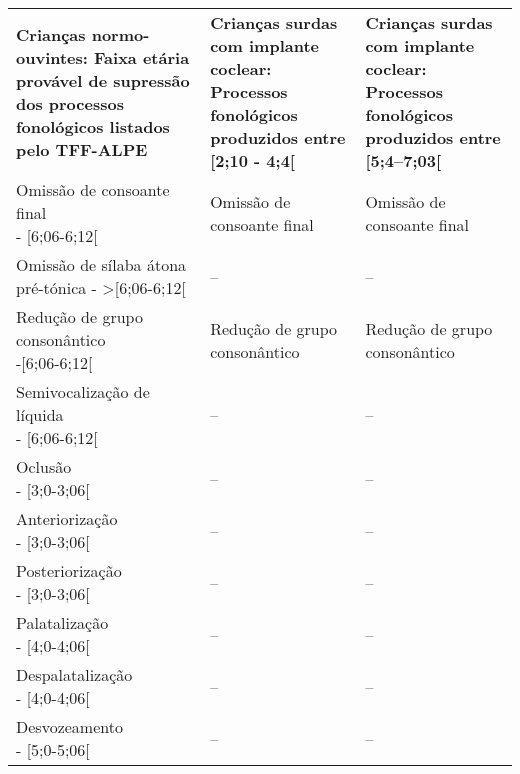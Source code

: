 \documentclass[output=paper,colorlinks,citecolor=brown,booklanguage=portuguese]{langscibook}
\begin{document}
\begin{Tabela}
\small
\begin{tabularx}{\textwidth}{p{5cm}QQ}
\lsptoprule


\textbf{Crianças normo-ouvintes: Faixa etária provável de supressão dos processos fonológicos listados pelo TFF-ALPE}            & \textbf{Crianças surdas com implante coclear: Processos fonológicos produzidos entre [2;10 - 4;4[}          & \textbf{Crianças surdas com implante coclear: Processos fonológicos produzidos entre [5;4--7;03[}\\

\midrule

{Omissão de consoante final \newline- [6;06-6;12[} &
Omissão de consoante final &
Omissão de consoante final\\


{Omissão de sílaba átona pré-tónica - >[6;06-6;12[}&
--	&
--\\


{Redução de grupo consonântico \newline-[6;06-6;12[} &	Redução de grupo consonântico&	Redução de grupo {consonântico}\\


{Semivocalização de líquida \newline- [6;06-6;12[}&
--	&
--\\


{Oclusão \newline- [3;0-3;06[}&
--	&
--\\


{Anteriorização \newline- [3;0-3;06[}&
--	&
--\\


{Posteriorização \newline- [3;0-3;06[}&
--	&
--\\


{Palatalização \newline- [4;0-4;06[}&
--	&
--\\


{Despalatalização \newline- [4;0-4;06[}&
--	&
--\\


{Desvozeamento \newline- [5;0-5;06[}&
--	&
--\\


\end{tabularx}
\end{Tabela}
\end{document}
